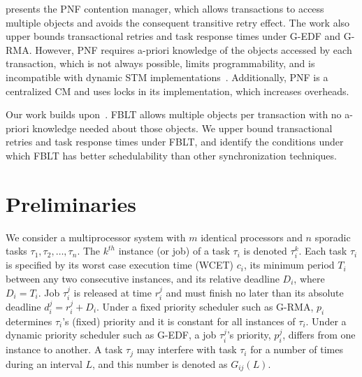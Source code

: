 \documentclass[prodmode,acmtecs]{acmsmall}
\begin{document}
\cite{shambake_phd_proposal} presents the PNF contention manager, which allows transactions to access  multiple objects and avoids the consequent transitive retry effect. The work also upper bounds transactional retries and task response times under G-EDF and G-RMA. However, PNF requires a-priori knowledge of the objects accessed by each transaction, which is not always possible, limits programmability, and is incompatible with dynamic STM implementations~\cite{Herlihy:2003:STM:872035.872048}. Additionally, PNF is a centralized CM and uses locks in its implementation, which increases overheads. 

Our work builds upon~\cite{stmconcurrencycontrol:emsoft11,lcmdac2012,shambake_phd_proposal}. FBLT allows multiple objects per transaction with no a-priori knowledge needed about those objects. We upper bound transactional retries and task response times under FBLT, and identify the conditions under which FBLT has  better schedulability than other synchronization techniques.


\section{Preliminaries}
\label{sec:model}

We consider a multiprocessor system with $m$ identical processors and $n$ sporadic tasks $\tau_1, \tau_2,\ldots, \tau_n$. The $k^{th}$ instance (or job) of a task $\tau_i$ is denoted $\tau_i^k$. Each task $\tau_i$ is specified by its worst case execution time (WCET) $c_i$, its minimum period $T_i$ between any two consecutive instances, and its relative deadline $D_i$, where $D_i=T_i$. Job $\tau_i^j$ is released at time $r_i^j$ and must finish no later than its absolute deadline $d_i^j=r_i^j+D_i$. Under a fixed priority scheduler such as G-RMA, $p_i$ determines $\tau_i$'s (fixed) priority and it is constant for all instances of $\tau_i$. Under a dynamic priority scheduler such as G-EDF, a job $\tau_i^j$'s priority, $p_i^j$, differs from one instance to another. 
A task $\tau_j$ may interfere with task $\tau_i$ for a number of times during an interval $L$, and this number is denoted as $G_{ij}(L)$. 
\end{document}
